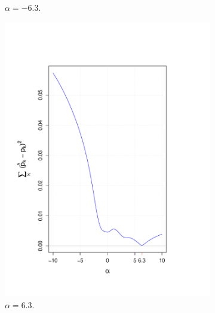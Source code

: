 \documentclass[10pt]{article}
\begin{document}
\begin{figure}[H]
\begin{subfigure}{.25\textwidth}
  \caption{ $\alpha = -6.3$.}
  \label{fig: alpha_negative}
\end{subfigure}%
\begin{subfigure}{.25\textwidth}
  \centering
  \includegraphics[width=\linewidth]{alpha_trace_6_3.pdf}
  \caption{ $\alpha = 6.3$.}
  \label{fig: alpha_positive}
\end{subfigure}%
\begin{subfigure}{.25\textwidth}
  \centering

\end{subfigure}
\end{figure}
\end{document}
